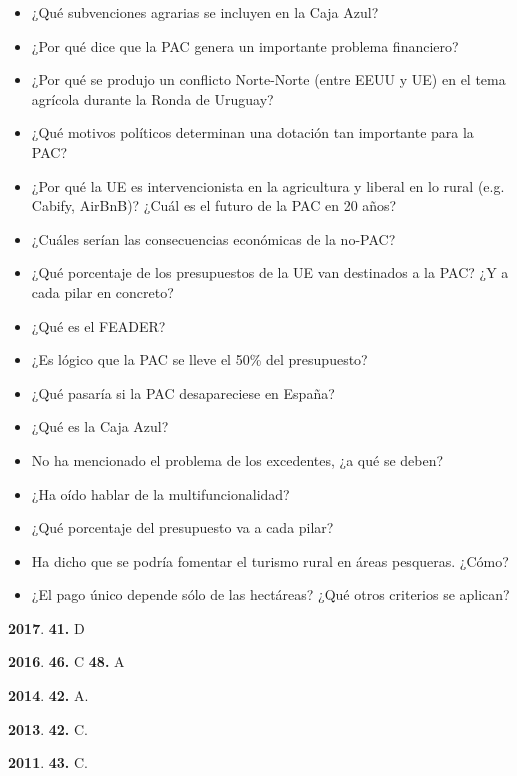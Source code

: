 \documentclass{nuevotema}
\begin{document}
\begin{itemize}
    \item ¿Qué subvenciones agrarias se incluyen en la Caja Azul?
    \item ¿Por qué dice que la PAC genera un importante problema financiero?
    \item ¿Por qué se produjo un conflicto Norte-Norte (entre EEUU y UE) en el tema agrícola durante la Ronda de Uruguay?
    \item ¿Qué motivos políticos determinan una dotación tan importante para la PAC?
    \item ¿Por qué la UE es intervencionista en la agricultura y liberal en lo rural (e.g. Cabify, AirBnB)? ¿Cuál es el futuro de la PAC en 20 años?
    \item ¿Cuáles serían las consecuencias económicas de la no-PAC?
    \item ¿Qué porcentaje de los presupuestos de la UE van destinados a la PAC? ¿Y a cada pilar en concreto? 
    \item ¿Qué es el FEADER?
\end{itemize}

\begin{itemize}
    \item ¿Es lógico que la PAC se lleve el 50\% del presupuesto?
    \item ¿Qué pasaría si la PAC desapareciese en España?
    \item ¿Qué es la Caja Azul?
    \item No ha mencionado el problema de los excedentes, ¿a qué se deben?
    \item ¿Ha oído hablar de la multifuncionalidad?
    \item ¿Qué porcentaje del presupuesto va a cada pilar?
    \item Ha dicho que se podría fomentar el turismo rural en áreas pesqueras. ¿Cómo?
    \item ¿El pago único depende sólo de las hectáreas? ¿Qué otros criterios se aplican?
\end{itemize}


\notas

\textbf{2017}. \textbf{41.} D

\textbf{2016}. \textbf{46.} C \textbf{48.} A

\textbf{2014}. \textbf{42.} A.

\textbf{2013}. \textbf{42.} C.

\textbf{2011}. \textbf{43.} C.
\end{document}
